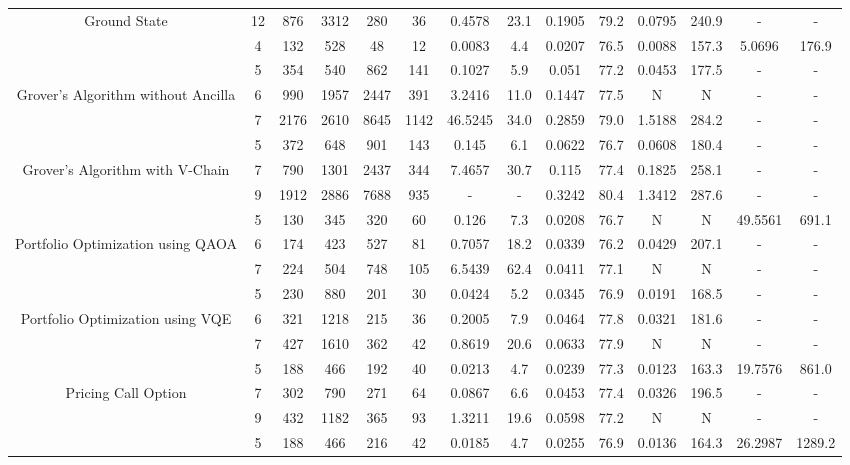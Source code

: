 \begin{table}[htb]
{\begin{tabular}{|c|c|c|c|c|c|c|c|c|c|c|c|c|c|}
Ground State & 
12 & 876 & 3312 & 280 & 36
 & 0.4578 & 23.1
 & 0.1905 & 79.2
 & 0.0795 & 240.9
 & - & -
 \\
 & 
4 & 132 & 528 & 48 & 12
 & 0.0083 & 4.4
 & 0.0207 & 76.5
 & 0.0088 & 157.3
 & 5.0696 & 176.9
 \\
\hline
 & 
5 & 354 & 540 & 862 & 141
 & 0.1027 & 5.9
 & 0.051 & 77.2
 & 0.0453 & 177.5
 & - & -
 \\
Grover's Algorithm without Ancilla & 
6 & 990 & 1957 & 2447 & 391
 & 3.2416 & 11.0
 & 0.1447 & 77.5
 & N & N 
 & - & -
 \\
 & 
7 & 2176 & 2610 & 8645 & 1142
 & 46.5245 & 34.0
 & 0.2859 & 79.0
 & 1.5188 & 284.2
 & - & -
 \\
\hline
 & 
5 & 372 & 648 & 901 & 143
 & 0.145 & 6.1
 & 0.0622 & 76.7
 & 0.0608 & 180.4
 & - & -
 \\
Grover's Algorithm with V-Chain & 
7 & 790 & 1301 & 2437 & 344
 & 7.4657 & 30.7
 & 0.115 & 77.4
 & 0.1825 & 258.1
 & - & -
 \\
 & 
9 & 1912 & 2886 & 7688 & 935
 & - & -
 & 0.3242 & 80.4
 & 1.3412 & 287.6
 & - & -
 \\
\hline
 & 
5 & 130 & 345 & 320 & 60
 & 0.126 & 7.3
 & 0.0208 & 76.7
 & N & N 
 & 49.5561 & 691.1
 \\
Portfolio Optimization using QAOA & 
6 & 174 & 423 & 527 & 81
 & 0.7057 & 18.2
 & 0.0339 & 76.2
 & 0.0429 & 207.1
 & - & -
 \\
 & 
7 & 224 & 504 & 748 & 105
 & 6.5439 & 62.4
 & 0.0411 & 77.1
 & N & N 
 & - & -
 \\
\hline
 & 
5 & 230 & 880 & 201 & 30
 & 0.0424 & 5.2
 & 0.0345 & 76.9
 & 0.0191 & 168.5
 & - & -
 \\
Portfolio Optimization using VQE & 
6 & 321 & 1218 & 215 & 36
 & 0.2005 & 7.9
 & 0.0464 & 77.8
 & 0.0321 & 181.6
 & - & -
 \\
 & 
7 & 427 & 1610 & 362 & 42
 & 0.8619 & 20.6
 & 0.0633 & 77.9
 & N & N 
 & - & -
 \\
\hline
 & 
5 & 188 & 466 & 192 & 40
 & 0.0213 & 4.7
 & 0.0239 & 77.3
 & 0.0123 & 163.3
 & 19.7576 & 861.0
 \\
Pricing Call Option & 
7 & 302 & 790 & 271 & 64
 & 0.0867 & 6.6
 & 0.0453 & 77.4
 & 0.0326 & 196.5
 & - & -
 \\
 & 
9 & 432 & 1182 & 365 & 93
 & 1.3211 & 19.6
 & 0.0598 & 77.2
 & N & N 
 & - & -
 \\
\hline
 & 
5 & 188 & 466 & 216 & 42
 & 0.0185 & 4.7
 & 0.0255 & 76.9
 & 0.0136 & 164.3
 & 26.2987 & 1289.2
 \\

\end{tabular}}
\end{table}
